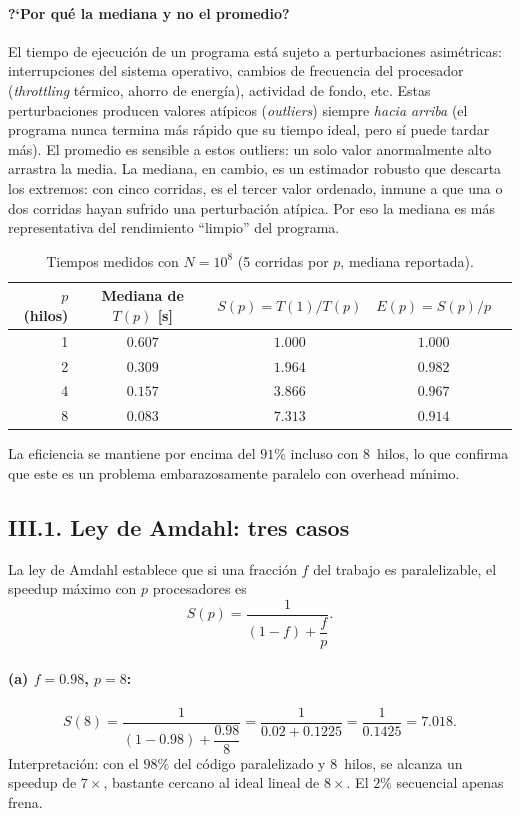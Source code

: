 \documentclass[12pt,a4paper]{article}
\begin{document}
\paragraph{?`Por qu\'e la mediana y no el promedio?}
El tiempo de ejecuci\'on de un programa est\'a sujeto a perturbaciones asim\'etricas: interrupciones del sistema operativo, cambios de frecuencia del procesador (\emph{throttling} t\'ermico, ahorro de energ\'ia), actividad de fondo, etc. Estas perturbaciones producen valores at\'ipicos (\emph{outliers}) siempre \emph{hacia arriba} (el programa nunca termina m\'as r\'apido que su tiempo ideal, pero s\'i puede tardar m\'as). El promedio es sensible a estos outliers: un solo valor anormalmente alto arrastra la media. La mediana, en cambio, es un estimador robusto que descarta los extremos: con cinco corridas, es el tercer valor ordenado, inmune a que una o dos corridas hayan sufrido una perturbaci\'on at\'ipica. Por eso la mediana es m\'as representativa del rendimiento ``limpio'' del programa.

\begin{table}[ht]
  \centering
  \caption{Tiempos medidos con $N=10^8$ (5 corridas por $p$, mediana reportada).}
  \label{tab:speedup}
  \begin{tabular}{rcccc}
    \toprule
    $p$ (hilos) & Mediana de $T(p)$ [s] & $S(p)=T(1)/T(p)$ & $E(p)=S(p)/p$ \\
    \midrule
    1 & $0.607$ & $1.000$ & $1.000$ \\
    2 & $0.309$ & $1.964$ & $0.982$ \\
    4 & $0.157$ & $3.866$ & $0.967$ \\
    8 & $0.083$ & $7.313$ & $0.914$ \\
    \bottomrule
  \end{tabular}
\end{table}

La eficiencia se mantiene por encima del $91\%$ incluso con 8~hilos, lo que confirma que este es un problema embarazosamente paralelo con overhead m\'inimo.

\subsection*{III.1. Ley de Amdahl: tres casos}

La ley de Amdahl establece que si una fracci\'on $f$ del trabajo es paralelizable, el speedup m\'aximo con $p$ procesadores es
\[
S(p) = \frac{1}{(1-f) + \dfrac{f}{p}}.
\]

\paragraph{(a) $f=0.98$, $p=8$:}
\[
S(8) = \frac{1}{(1-0.98) + \dfrac{0.98}{8}}
     = \frac{1}{0.02 + 0.1225}
     = \frac{1}{0.1425}
     = 7.018.
\]
Interpretaci\'on: con el $98\%$ del c\'odigo paralelizado y 8~hilos, se alcanza un speedup de $7\times$, bastante cercano al ideal lineal de $8\times$. El $2\%$ secuencial apenas frena.
\end{document}
